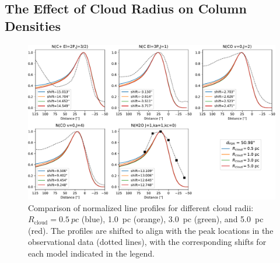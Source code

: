 \documentclass[12pt,a4paper]{article}
\newcommand{\mr}{\mathrm}
\begin{document}
\subsection*{The Effect of Cloud Radius on Column Densities}
\begin{figure}[h!]
    \centering
    \includegraphics[width=\textwidth,keepaspectratio]{comp_curvature_obs_shape.pdf}
    \caption{Comparison of normalized line profiles for different cloud radii: $R_\mr{cloud} = \qty{0.5}{pc}$ (blue), \qty{1.0}{pc} (orange), \qty{3.0}{pc} (green), and \qty{5.0}{pc} (red). The profiles are shifted to align with the peak locations in the observational data (dotted lines), with the corresponding shifts for each model indicated in the legend.} \label{fig:comprad_shape}
\end{figure}

\clearpage
\end{document}
